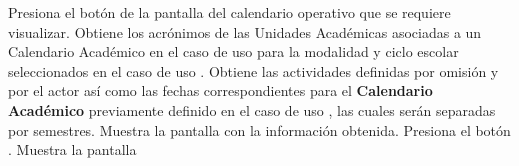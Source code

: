 
\begin{UCtrayectoria}
    \UCpaso [\UCactor] Presiona el botón  de la pantalla  del calendario operativo que se requiere visualizar.
    \UCpaso Obtiene los acrónimos de las Unidades Académicas asociadas a un Calendario Académico en el caso de uso  para la modalidad y ciclo escolar seleccionados en el caso de uso .
    \UCpaso  Obtiene las actividades definidas por omisión y por el actor así como las fechas correspondientes para el \textbf{Calendario Académico} previamente definido en el caso de uso , las cuales serán separadas por semestres.
    \UCpaso Muestra la pantalla  con la información obtenida.
    \UCpaso [\UCactor] Presiona el botón .
    \UCpaso Muestra la pantalla  
\end{UCtrayectoria}




